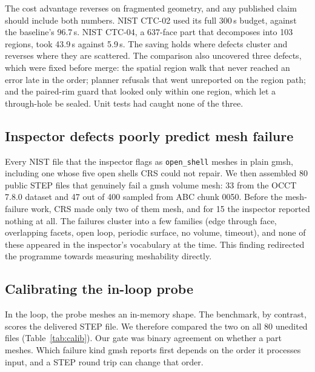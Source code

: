 \documentclass[11pt,onecolumn]{article}
\newcommand{\code}[1]{\texttt{\small #1}}
\begin{document}
The cost advantage reverses on fragmented geometry, and any published claim should include both
numbers. NIST CTC-02 used its full 300\,s budget, against the baseline's 96.7\,s. NIST CTC-04, a
637-face part that decomposes into 103 regions, took 43.9\,s against 5.9\,s. The saving holds where
defects cluster and reverses where they are scattered. The comparison also uncovered three defects,
which were fixed before merge: the spatial region walk that never reached an error late in the
order; planner refusals that went unreported on the region path; and the paired-rim guard that
looked only within one region, which let a through-hole be sealed. Unit tests had caught none of the
three.

\subsection{Inspector defects poorly predict mesh failure}\label{sec:predict}
Every NIST file that the inspector flags as \code{open\_shell} meshes in plain gmsh, including one
whose five open shells CRS could not repair. We then assembled 80 public STEP files that genuinely
fail a gmsh volume mesh: 33 from the OCCT 7.8.0 dataset and 47 out of 400 sampled from ABC chunk
0050. Before the mesh-failure work, CRS made only two of them mesh, and for 15 the inspector
reported nothing at all. The failures cluster into a few families (edge through face, overlapping
facets, open loop, periodic surface, no volume, timeout), and none of these appeared in the
inspector's vocabulary at the time. This finding redirected the programme towards measuring
meshability directly.

\subsection{Calibrating the in-loop probe}
In the loop, the probe meshes an in-memory shape. The benchmark, by contrast, scores the delivered
STEP file. We therefore compared the two on all 80 unedited files (Table~\ref{tab:calib}). Our gate
was binary agreement on whether a part meshes. Which failure kind gmsh reports first depends on the
order it processes input, and a STEP round trip can change that order.
\end{document}
